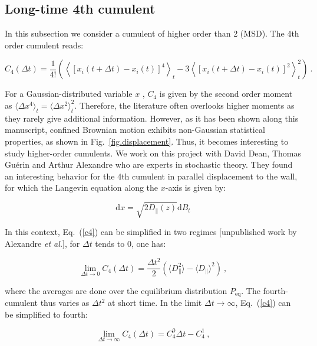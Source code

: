 {\subsection{Long-time 4th cumulent}

In this subsection we consider a cumulent of higher order than 2 (\gls{MSD}). The 4th order cumulent reads:

\begin{equation}
	C_4 (\Delta t) = \frac{1}{4!} \left(
	\left\langle [ x_i(t + \Delta t) - x_i(t) ]^4 \right\rangle_t
	- 3\left\langle [ x_i(t + \Delta t) - x_i(t) ]^2 \right\rangle_t ^2
	\right) ~.
	\label{c4}
\end{equation}

For a Gaussian-distributed variable $x$ , $C_4$ is given by the second order moment as $ \langle \Delta x^4 \rangle_t  = \langle \Delta x ^2 \rangle _t ^2 $. Therefore, the literature often overlooks higher moments as they rarely give additional information. However, as it has been shown along this manuscript, confined Brownian motion exhibits non-Gaussian statistical properties, as shown in Fig.~\ref{fig.displacement}. Thus, it becomes interesting to study higher-order cumulents. We work on this project with David Dean, Thomas Guérin and Arthur Alexandre who are experts in stochastic theory. They found an interesting behavior for the 4th cumulent in parallel displacement to the wall, for which the Langevin equation along the $x$-axis is given by:

\begin{equation}
	\mathrm{d}x = \sqrt{2D_\parallel(z)} \mathrm{d}B_t
	\label{c4.dx}
\end{equation}

In this context, Eq.~(\ref{c4}) can be simplified in two regimes [unpublished work by Alexandre \textit{et al.}], for $\Delta t $ tends to $0$, one has:

\begin{equation}
	\lim\limits_{\Delta t \rightarrow 0 } C_4 (\Delta t) = \frac{\Delta t ^2}{2}
	\left(
	\langle D_\parallel ^2 \rangle - \langle D _\parallel \rangle ^2 
	\right)~,
	\label{c4short}
\end{equation}

where the averages are done over the equilibrium distribution $P_\mathrm{eq}$. The fourth-cumulent thus varies as $\Delta t ^2$ at short time. In the limit $\Delta t \rightarrow \infty$, Eq.~(\ref{c4}) can be simplified to fourth:

\begin{equation}
	\lim\limits_{\Delta t \rightarrow \infty } C_4 (\Delta t) = C_4 ^0 \Delta t - C^1 _4 ~,
\end{equation}

}
